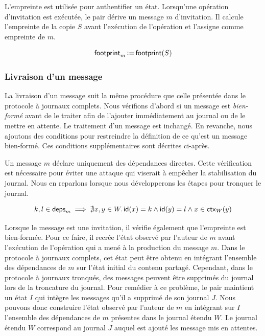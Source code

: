 L'empreinte est utilisée pour authentifier un état.
Lorsqu'une opération d'invitation est exécutée, le pair dérive un message $m$ d'invitation.
Il calcule l'empreinte de la copie $S$ avant l'exécution de l'opération et l'assigne comme empreinte de $m$.

\begin{equation*}
    \operatorname{\mathsf{footprint}}_m \operatorname{\vcentcolon=} \operatorname{\mathsf{footprint}}(S)
\end{equation*}


\subsubsection{Livraison d'un message}

La livraison d'un message suit la même procédure que celle présentée dans le protocole à journaux complets.
Nous vérifions d'abord si un message est \emph{bien-formé} avant de le traiter afin de l'ajouter immédiatement au journal ou de le mettre en attente.
Le traitement d'un message est inchangé.
En revanche, nous ajoutons des conditions pour restreindre la définition de ce qu'est un message bien-formé.
Ces conditions supplémentaires sont décrites ci-après.

Un message $m$ déclare uniquement des dépendances directes.
Cette vérification est nécessaire pour éviter une attaque qui viserait à empêcher la stabilisation du journal.
Nous en reparlons lorsque nous développerons les étapes pour tronquer le journal.

\begin{equation}\label{eq:direct-dep-verif}
    k, l \in \operatorname{\mathsf{deps}}_m \implies \nexists x, y \in W \ldotp \operatorname{\mathsf{id}}(x) = k \land \operatorname{\mathsf{id}}(y) = l \land x \in \operatorname{\mathsf{ctx}}_W(y)
\end{equation}


Lorsque le message est une invitation, il vérifie également que l'empreinte est bien-formée.
Pour ce faire, il recrée l'état observé par l'auteur de $m$ avant l'exécution de l'opération qui a mené à la production du message $m$.
Dans le protocole à journaux complets, cet état peut être obtenu en intégrant l'ensemble des dépendances de $m$ sur l'état initial du contenu partagé.
Cependant, dans le protocole à journaux tronqués, des messages peuvent être supprimés du journal lors de la troncature du journal.
Pour remédier à ce problème, le pair maintient un état $I$ qui intègre les messages qu'il a supprimé de son journal $J$.
Nous pouvons donc construire l'état observé par l'auteur de $m$ en intégrant sur $I$ l'ensemble des dépendances de $m$ présentes dans le journal étendu $W$.
Le journal étendu $W$ correspond au journal $J$ auquel est ajouté les message mis en attentes.

